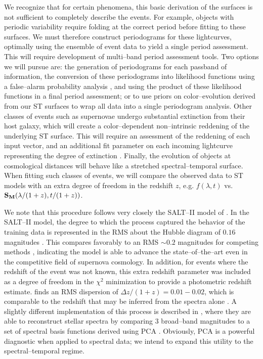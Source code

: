  We recognize that for certain
phenomena, this basic derivation of the surfaces is not sufficient to completely
describe the events. For example, objects with periodic variability require
folding at the correct period before fitting to these surfaces.  We must
therefore construct periodograms for these lightcurves, optimally using the
ensemble of event data to yield a single period assessment.  This will require
development of multi--band period assessment tools.  Two options we will pursue
are: the generation of periodograms for each passband of information, the
conversion of these periodograms into likelihood functions using a false--alarm
probability analysis \citep[e.g.][and references therein]{2009A&A...496..577Z},
and using the product of these likelihood functions in a final period
assessment; or to use priors on color--evolution derived from our ST surfaces to
wrap all data into a single periodogram analysis.  Other classes of events such
as supernovae undergo substantial extinction from their host galaxy, which will
create a color--dependent non--intrinsic reddening of the underlying ST surface.
This will require an assessment of the reddening of each input vector, and an
additional fit parameter on each incoming lightcurve representing the degree of
extinction \cite[e.g. Equation 1,][]{2007A&A...466...11G}.  Finally, the
evolution of objects at cosmological distances will behave like a stretched
spectral--temporal surface.  When fitting such classes of events, we will
compare the observed data to ST models with an extra degree of freedom in the
redshift $z$, e.g. $f(\lambda, t)$ vs. ${\bf S_M}(\lambda/(1+z), t/(1+z))$.

 We note that this procedure follows very closely
the SALT--II model of \cite{2007A&A...466...11G}.  In the SALT--II model, the
degree to which the process captured the behavior of the training data is
represented in the RMS about the Hubble diagram of $0.16$ magnitudes
\citep{2007A&A...466...11G}.  This compares favorably to an RMS $\sim 0.2$
magnitudes for competing methods \citep{2009ApJS..185...32K}, indicating the
model is able to advance the state--of--the--art even in the competitive field
of supernova cosmology. In addition, for events where the redshift of the event
was not known, this extra redshift parameter was included as a degree of freedom
in the $\chi^2$ minimization to provide a photometric redshift estimate.
\cite{2007A&A...466...11G} finds an RMS dispersion of $\Delta z/(1 + z) =
0.01-0.02$, which is comparable to the redshift that may be inferred from the
spectra alone \citep[see also][]{2010ApJ...717...40K}.  A slightly different
implementation of this process is described in \cite{2010ApJ...719.1759A}, where
they are able to reconstruct stellar spectra by comparing 3 broad--band
magnitudes to a set of spectral basis functions derived using PCA
\citep{2010AJ....139.1261M}.  Obviously, PCA is a powerful diagnostic when
applied to spectral data; we intend to expand this utility to the
spectral--temporal regime.

